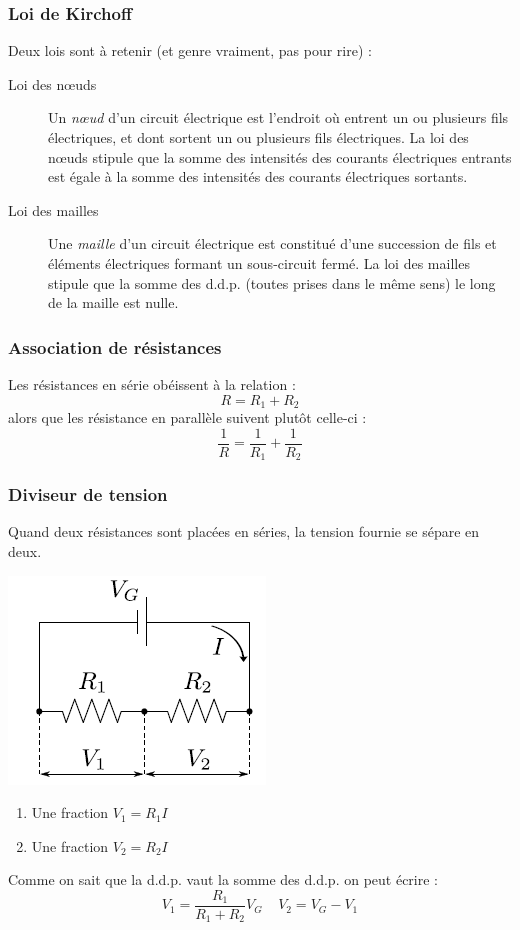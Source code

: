 \documentclass	[11pt, a4paper, openany]{book}
\begin{document}
\subsubsection*{Loi de Kirchoff}
Deux lois sont à retenir (et genre vraiment, pas pour rire) : 
\begin{description}
\item[Loi des nœuds] Un \textit{nœud} d'un circuit électrique est l'endroit où entrent un ou plusieurs fils électriques, et dont sortent un ou plusieurs fils électriques. La loi des nœuds stipule que la somme des intensités des courants électriques entrants est égale à la somme des intensités des courants électriques sortants.
\item[Loi des mailles] Une \textit{maille} d'un circuit électrique est constitué d'une succession de fils et éléments électriques formant un sous-circuit fermé. La loi des mailles stipule que la somme des d.d.p. (toutes prises dans le même sens) le long de la maille est nulle.
\end{description}


\subsubsection*{Association de résistances}
Les résistances en série obéissent à la relation :
\begin{equation}
R = R_1 + R_2
\end{equation}
alors que les résistance en parallèle suivent plutôt celle-ci :
\begin{equation}
\frac{1}{R} = \frac{1}{R_1} + \frac{1}{R_2}
\end{equation}

\subsubsection*{Diviseur de tension}
Quand deux résistances sont placées en séries, la tension fournie se sépare en deux.
\begin{center}
\includegraphics[scale=0.5]{labo/image9.png}
\end{center}
\begin{enumerate}
\item Une fraction $V_1 = R_1I$
\item Une fraction $V_2 = R_2I$
\end{enumerate}
Comme on sait que la d.d.p. vaut la somme des d.d.p. on peut écrire : 
\begin{equation}
V_1 = \frac{R_1}{R_1 + R_2}V_G\ \ \ \ \ V_2 = V_G - V_1
\end{equation}
\end{document}
